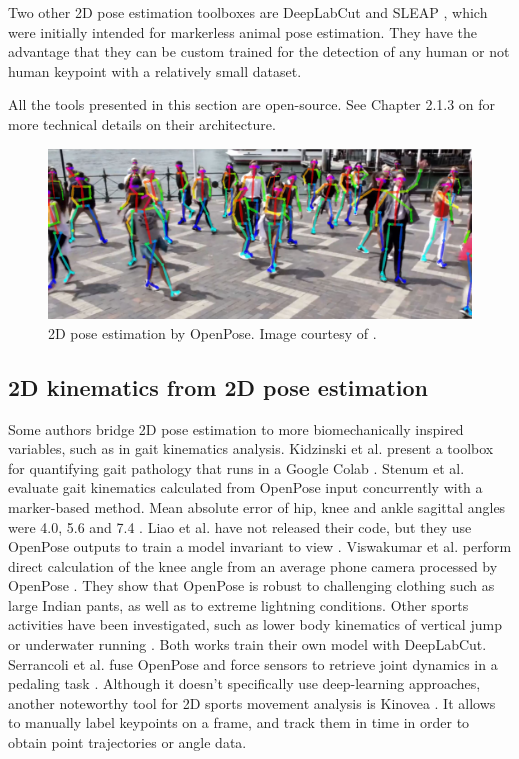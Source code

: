 Two other 2D pose estimation toolboxes are DeepLabCut \cite{Mathis2018,Lauer2022} and SLEAP \cite{Pereira2022}, which were initially intended for markerless animal pose estimation. They have the advantage that they can be custom trained for the detection of any human or not human keypoint with a relatively small dataset. 

All the tools presented in this section are open-source. See Chapter 2.1.3 on  for more technical details on their architecture.

\begin{figure}[hbtp]
	\centering
	\def\svgwidth{1\columnwidth}
	\fontsize{10pt}{10pt}\selectfont
	\includegraphics[width=\linewidth]{"../Chap1/Figures/Fig_OpenPose.JPG"}
	\caption{2D pose estimation by OpenPose. Image courtesy of \cite{Cao2019}.}
	\label{fig_openpose}
\end{figure}


\subsection{2D kinematics from 2D pose estimation}

Some authors bridge 2D pose estimation to more biomechanically inspired variables, such as in gait kinematics analysis. Kidzinski et al. present a toolbox for quantifying gait pathology that runs in a Google Colab \cite{Kidziński2020}. Stenum et al. evaluate gait kinematics calculated from OpenPose input concurrently with a marker-based method. Mean absolute error of hip, knee and ankle sagittal angles were 4.0\degree{}, 5.6\degree{} and 7.4\degree{} \cite{Stenum2021}. Liao et al. have not released their code, but they use OpenPose outputs to train a model invariant to view \cite{Liao2020}. Viswakumar et al. perform direct calculation of the knee angle from an average phone camera processed by OpenPose \cite{Viswakumar2019}. They show that OpenPose is robust to challenging clothing such as large Indian pants, as well as to extreme lightning conditions. Other sports activities have been investigated, such as lower body kinematics of vertical jump \cite{Drazan2021} or underwater running \cite{Cronin2019}. Both works train their own model with DeepLabCut. Serrancoli et al. fuse OpenPose and force sensors to retrieve joint dynamics in a pedaling task \cite{Serrancolí2020}. Although it doesn't specifically use deep-learning approaches, another noteworthy tool for 2D sports movement analysis is Kinovea \cite{Fernandez2020}. It allows to manually label keypoints on a frame, and track them in time in order to obtain point trajectories or angle data. 


